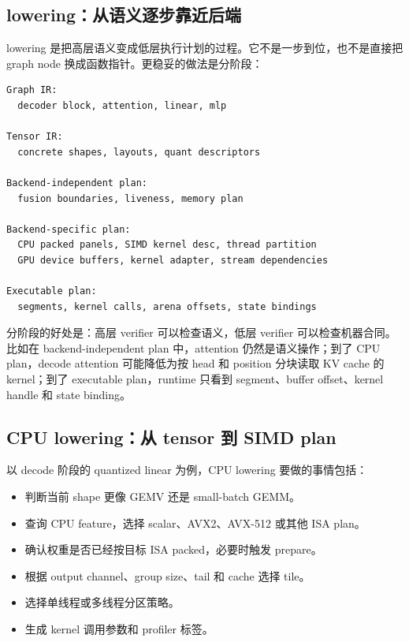\subsection{lowering：从语义逐步靠近后端}

lowering 是把高层语义变成低层执行计划的过程。它不是一步到位，也不是直接把 graph node 换成函数指针。更稳妥的做法是分阶段：

\begin{lstlisting}[numbers=none,caption={AI 编译器 lowering 阶段}]
Graph IR:
  decoder block, attention, linear, mlp

Tensor IR:
  concrete shapes, layouts, quant descriptors

Backend-independent plan:
  fusion boundaries, liveness, memory plan

Backend-specific plan:
  CPU packed panels, SIMD kernel desc, thread partition
  GPU device buffers, kernel adapter, stream dependencies

Executable plan:
  segments, kernel calls, arena offsets, state bindings
\end{lstlisting}

分阶段的好处是：高层 verifier 可以检查语义，低层 verifier 可以检查机器合同。比如在 backend-independent plan 中，attention 仍然是语义操作；到了 CPU plan，decode attention 可能降低为按 head 和 position 分块读取 KV cache 的 kernel；到了 executable plan，runtime 只看到 segment、buffer offset、kernel handle 和 state binding。

\subsection{CPU lowering：从 tensor 到 SIMD plan}

以 decode 阶段的 quantized linear 为例，CPU lowering 要做的事情包括：

\begin{itemize}
  \item 判断当前 shape 更像 GEMV 还是 small-batch GEMM。
  \item 查询 CPU feature，选择 scalar、AVX2、AVX-512 或其他 ISA plan。
  \item 确认权重是否已经按目标 ISA packed，必要时触发 prepare。
  \item 根据 output channel、group size、tail 和 cache 选择 tile。
  \item 选择单线程或多线程分区策略。
  \item 生成 kernel 调用参数和 profiler 标签。
\end{itemize}

